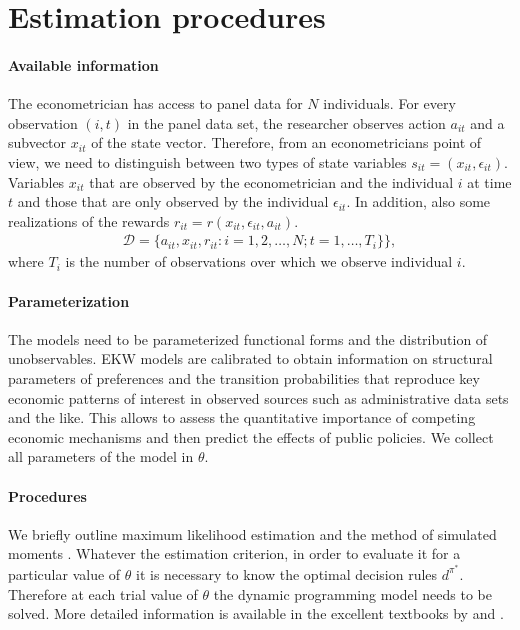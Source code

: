 \section{Estimation procedures}\label{Estimation}
\paragraph{Available information} The econometrician has access to panel data for $N$ individuals. For every observation $(i, t)$ in the panel data set, the researcher observes action $a_{it}$ and a subvector $x_{it}$ of the state vector. Therefore, from an econometricians point of view, we need to distinguish between two types of state variables $s_{it} = (x_{it}, \epsilon_{it})$. Variables $x_{it}$ that are observed by the econometrician and the individual $i$ at time $t$ and those that are only observed by the individual $\epsilon_{it}$.  In addition, also some realizations of the rewards $r_{it} = r(x_{it}, \epsilon_{it}, a_{it})$.
%
\begin{align*}
  \mathcal{D} = \{a_{it}, x_{it}, r_{it}: i = 1,2, \hdots, N; t = 1, \hdots, T_i\}
  \},
\end{align*}
where $T_i$ is the number of observations over which we observe individual $i$.

\paragraph{Parameterization} The models need to be parameterized functional forms and the distribution of unobservables. EKW models are calibrated to obtain information on structural parameters of preferences and the transition probabilities that reproduce key economic patterns of interest in observed sources such as administrative data sets and the like. This allows to assess the quantitative importance of competing economic mechanisms and then predict the effects of public policies. We collect all parameters of the model in $\theta$.

\paragraph{Procedures} We briefly outline maximum likelihood estimation \citep{Fisher.1922} and the method of simulated moments \citep{McFadden.1989}.  Whatever the estimation criterion, in order to evaluate it for a particular value of $\theta$  it is necessary to know the optimal decision rules $d^{\pi^*}$. Therefore at each trial value of $\theta$ the dynamic programming model needs to be solved. More detailed information is available in the excellent textbooks by \citet{Davidson.2003} and \citet{Gourieroux.1996}.

